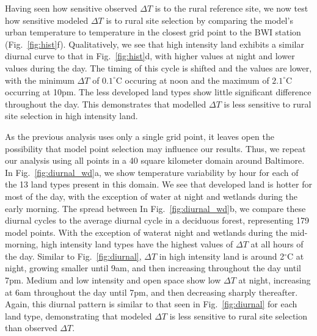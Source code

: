 Having seen how sensitive observed $\Delta T$ is to the rural reference site, we now test how sensitive modeled $\Delta T$ is to rural site selection by comparing the model's urban temperature to temperature in the closest grid point to the BWI station (Fig.~\ref{fig:hist}f).
Qualitatively, we see that high intensity land exhibits a similar diurnal curve to that in Fig.~\ref{fig:hist}d, with higher values at night and lower values during the day. The timing of this cycle is shifted and the values are lower, with the minimum $\Delta T$ of $0.1^\circ$C occuring at noon and the maximum of $2.1^\circ$C occurring at 10pm. The less developed land types show little significant difference throughout the day. 
This demonstrates that modelled $\Delta T$ is less sensitive to rural site selection in high intensity land. 

As the previous analysis uses only a single grid point, it leaves open the possibility that model point selection may influence our results. Thus, we repeat our analysis using all points in a 40 square kilometer domain around Baltimore. In Fig.~\ref{fig:diurnal_wd}a, we show temperature variability by hour for each of the 13 land types present in this domain. We see that developed land is hotter for most of the day, with the exception of water at night and wetlands during the early morning. The spread between 
In Fig.~\ref{fig:diurnal_wd}b, we compare these diurnal cycles to the average diurnal cycle in a deciduous forest, representing 179 model points. With the exception of waterat night and wetlands during the mid-morning, high intensity land types have the highest values of $\Delta T$ at all hours of the day. Similar to Fig.~\ref{fig:diurnal}, $\Delta T$ in high intensity land is around 2$^\circ$C at night, growing smaller until 9am, and then increasing throughout the day until 7pm. Medium and low intensity and open space show low $\Delta T$ at night, increasing at 6am throughout the day until 7pm, and then decreasing sharply thereafter. Again, this diurnal pattern is similar to that seen in Fig.~\ref{fig:diurnal} for each land type, demonstrating that modeled $\Delta T$ is less sensitive to rural site selection than observed $\Delta T$. 
 
